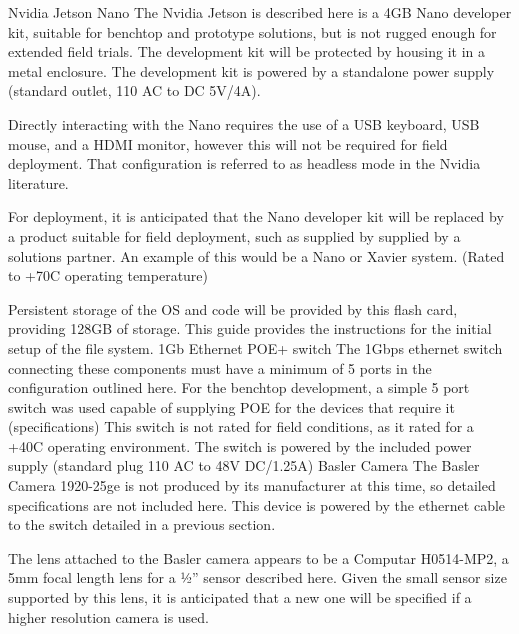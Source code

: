 \documentclass[letterpaper]{article}
\begin{document}
Nvidia Jetson Nano
The Nvidia Jetson is described here is a 4GB Nano developer kit, suitable for benchtop and prototype solutions, but is not rugged enough for extended field trials. The development kit will be protected by housing it in a metal enclosure. The development kit is powered by a standalone power supply (standard outlet, 110 AC to DC 5V/4A).

Directly interacting with the Nano requires the use of a USB keyboard, USB mouse, and a HDMI monitor, however this will not be required for field deployment. That configuration is referred to as headless mode in the Nvidia literature.

For deployment, it is anticipated that the Nano developer kit will be replaced by a product suitable for field deployment, such as supplied by supplied by a solutions partner.  An example of this would be a Nano or Xavier system. (Rated to +70C operating temperature)

Persistent storage of the OS and code will be provided by this flash card, providing 128GB of storage.  This guide provides the instructions for the initial setup of the file system.
1Gb Ethernet POE+ switch
The 1Gbps ethernet switch connecting these components must have a minimum of 5 ports in the configuration outlined here. For the benchtop development, a simple 5 port switch was used capable of supplying POE for the devices that require it (specifications)  This switch is not rated for field conditions, as it rated for a +40C operating environment. The switch is powered by the included power supply (standard plug 110 AC to 48V DC/1.25A)
Basler Camera
The Basler Camera 1920-25ge is not produced by its manufacturer at this time, so detailed specifications are not included here.  This device is powered by the ethernet cable to the switch detailed in a previous section.

The lens attached to the Basler camera appears to be a Computar H0514-MP2, a 5mm focal length lens for a ½” sensor described here. Given the small sensor size supported by this lens, it is anticipated that a new one will be specified if a higher resolution camera is used.
\end{document}
